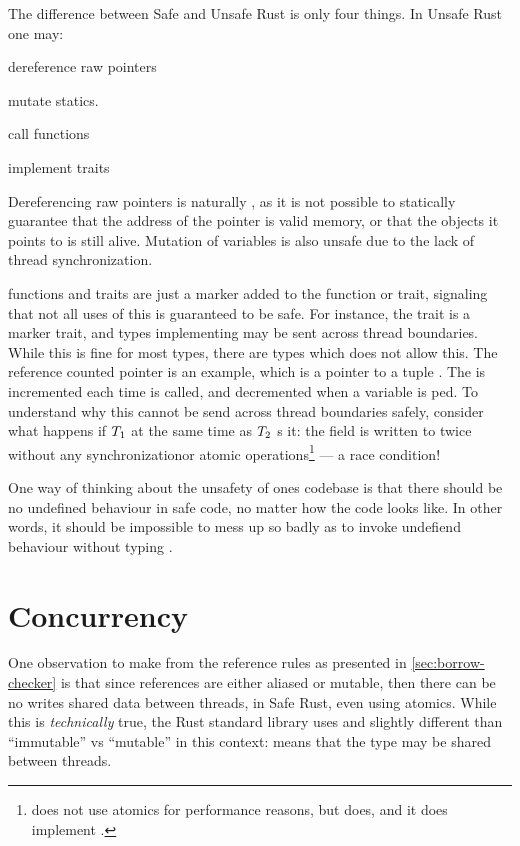 The difference between Safe and Unsafe Rust is only four things. In Unsafe Rust one may:
\begin{enumerate*}[1) ]
    \item dereference raw pointers
    \item mutate statics.
    \item call  functions
    \item implement  traits
\end{enumerate*}

Dereferencing raw pointers is naturally , as it is not possible to statically
guarantee that the address of the pointer is valid memory, or that the objects it points to is
still alive. Mutation of   variables is also unsafe due to the lack of thread
synchronization.

 functions and traits are just a marker added to the function or trait, signaling that
not all uses of this is guaranteed to be safe. For instance, the trait  is a marker
trait, and types implementing  may be sent across thread boundaries. While this is fine
for most types, there are types which does not allow this. The reference counted pointer
 is an example, which is a pointer to a tuple . The  is
incremented each time  is called, and decremented when a variable is ped.
To understand why this cannot be send across thread boundaries safely, consider what happens if
$T\sb{1}$  at the same time as $T\sb{2}$ s it: the  field is
written to twice without any synchronizationor atomic operations\footnote{ does not use
atomics for performance reasons, but  does, and it does implement .} --- a race
condition!

One way of thinking about the unsafety of ones codebase is that there should be no undefined
behaviour in safe code, no matter how the code looks like. In other words, it should be impossible
to mess up so badly as to invoke undefiend behaviour without typing .



\section{Concurrency}

One observation to make from the reference rules as presented in \cref{sec:borrow-checker} is that
since references are either aliased or mutable, then there can be no writes shared data between
threads, in Safe Rust, even using atomics. While this is \emph{technically} true, the Rust standard
library uses  and  slightly different than ``immutable'' vs ``mutable'' in
this context:  means that the type may be shared between threads.

